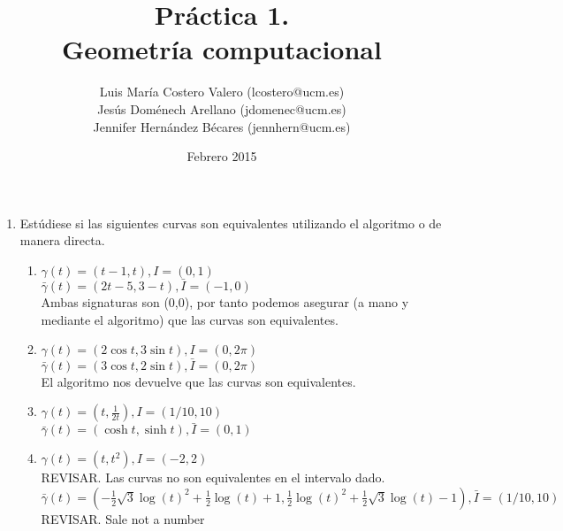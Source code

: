 \documentclass[12pt,a4paper]{article}
\title{Práctica 1. \\ Geometría computacional}
\author{Luis María Costero Valero (lcostero@ucm.es)\\ Jesús Doménech
  Arellano (jdomenec@ucm.es) \\ Jennifer Hernández Bécares (jennhern@ucm.es)}
\date{Febrero 2015}
\begin{document}
\maketitle
\onehalfspace

\begin{enumerate}
\item Estúdiese si las siguientes curvas son equivalentes utilizando el
  algoritmo o de manera directa.
  \begin{enumerate}
  \item $\gamma(t)=(t-1,t),I=(0,1)$ \\
    $\bar{\gamma}(t)=(2t-5,3-t),\bar{I}=(-1,0)$ \\ Ambas signaturas son
    (0,0), por tanto podemos asegurar (a mano y mediante el algoritmo) que
    las curvas son equivalentes.
  \item $\gamma(t)=(2\cos t,3\sin t),I=(0,2\pi)$ \\
    $\bar{\gamma}(t)=(3\cos t,2\sin t),\bar{I}=(0,2\pi)$ \\ El algoritmo
    nos devuelve que las curvas son equivalentes.
  \item $\gamma(t)=(t,\frac{1}{2t}),I=(1/10, 10)$ \\
    $\bar{\gamma}(t)=(\cosh
    t,\sinh t),\bar{I}=(0,1)$ \\
  \item $\gamma(t)=(t,t^{2}),I=(-2,2)$ \\ REVISAR. Las curvas no son
    equivalentes en el intervalo dado.
    $\bar{\gamma}(t)=(-\frac{1}{2}\sqrt{3}\log(t)^{2}+\frac{1}{2}\log(t)+1,\frac{1}{2}\log(t)^{2}+\frac{1}{2}\sqrt{3}\log(t)-1),\bar{I}=(1/10,10)$
    \\ REVISAR. Sale not a number
  \end{enumerate}


\end{enumerate}
\end{document}
